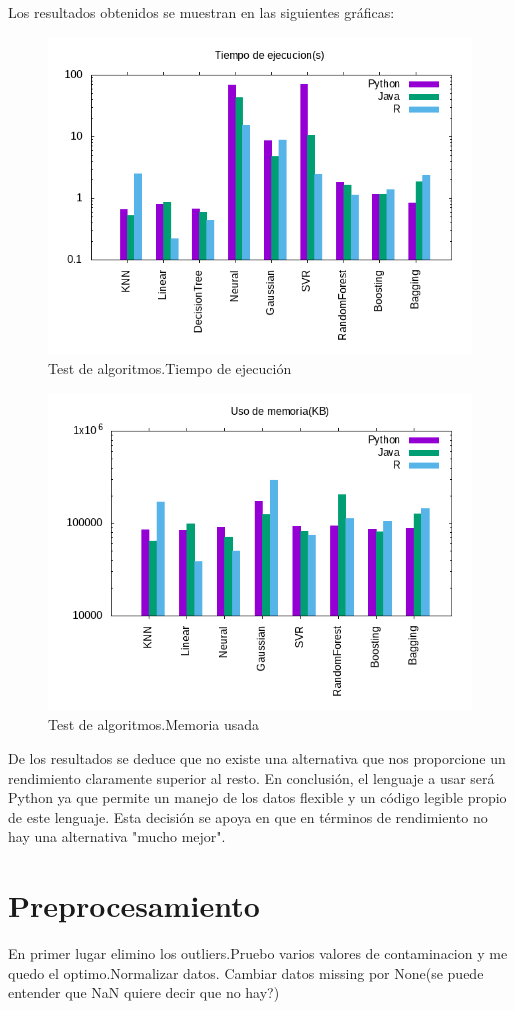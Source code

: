  Los resultados obtenidos se muestran en las siguientes gráficas:	
 \begin{figure}[!h]
 	\includegraphics[scale=0.75]{./img/tiempos.png}
 	\caption{Test de algoritmos.Tiempo de ejecución}
 \end{figure}
 \begin{figure}[H]
 	\includegraphics[scale=0.75]{./img/memoria.png}
 	\caption{Test de algoritmos.Memoria usada}
 \end{figure}
 De los resultados se deduce que no existe una alternativa que nos proporcione un rendimiento claramente superior al resto. 
 En conclusión, el lenguaje a usar será Python ya que permite un manejo de los datos flexible y un código legible propio de este lenguaje. Esta decisión se apoya en que en términos de rendimiento no hay una alternativa "mucho mejor". 
\section{Preprocesamiento}
En primer lugar elimino los outliers.Pruebo varios valores de contaminacion y me quedo el optimo.Normalizar datos. Cambiar datos missing por None(se puede entender que NaN quiere decir que no hay?)